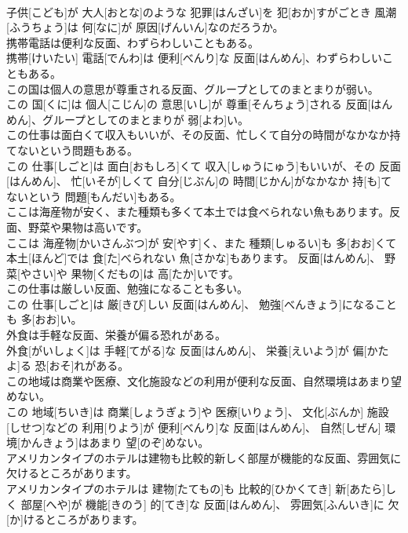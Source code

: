 \documentclass[8pt]{extreport}
\begin{document}
\begin{CJK}{UTF8}{min}
\\	子供[こども]が 大人[おとな]のような 犯罪[はんざい]を 犯[おか]すがごとき 風潮[ふうちょう]は 何[なに]が 原因[げんいん]なのだろうか。
\\	携帯電話は便利な反面、わずらわしいこともある。	
\\	携帯[けいたい] 電話[でんわ]は 便利[べんり]な 反面[はんめん]、わずらわしいこともある。
\\	この国は個人の意思が尊重される反面、グループとしてのまとまりが弱い。	
\\	この 国[くに]は 個人[こじん]の 意思[いし]が 尊重[そんちょう]される 反面[はんめん]、グループとしてのまとまりが 弱[よわ]い。
\\	この仕事は面白くて収入もいいが、その反面、忙しくて自分の時間がなかなか持てないという問題もある。	
\\	この 仕事[しごと]は 面白[おもしろ]くて 収入[しゅうにゅう]もいいが、その 反面[はんめん]、 忙[いそが]しくて 自分[じぶん]の 時間[じかん]がなかなか 持[も]てないという 問題[もんだい]もある。
\\	ここは海産物が安く、また種類も多くて本土では食べられない魚もあります。反面、野菜や果物は高いです。	
\\	ここは 海産物[かいさんぶつ]が 安[やす]く、また 種類[しゅるい]も 多[おお]くて 本土[ほんど]では 食[た]べられない 魚[さかな]もあります。 反面[はんめん]、 野菜[やさい]や 果物[くだもの]は 高[たか]いです。
\\	この仕事は厳しい反面、勉強になることも多い。	
\\	この 仕事[しごと]は 厳[きび]しい 反面[はんめん]、 勉強[べんきょう]になることも 多[おお]い。
\\	外食は手軽な反面、栄養が偏る恐れがある。	
\\	外食[がいしょく]は 手軽[てがる]な 反面[はんめん]、 栄養[えいよう]が 偏[かたよ]る 恐[おそ]れがある。
\\	この地域は商業や医療、文化施設などの利用が便利な反面、自然環境はあまり望めない。	
\\	この 地域[ちいき]は 商業[しょうぎょう]や 医療[いりょう]、 文化[ぶんか] 施設[しせつ]などの 利用[りよう]が 便利[べんり]な 反面[はんめん]、 自然[しぜん] 環境[かんきょう]はあまり 望[のぞ]めない。
\\	アメリカンタイプのホテルは建物も比較的新しく部屋が機能的な反面、雰囲気に欠けるところがあります。	
\\	アメリカンタイプのホテルは 建物[たてもの]も 比較的[ひかくてき] 新[あたら]しく 部屋[へや]が 機能[きのう] 的[てき]な 反面[はんめん]、 雰囲気[ふんいき]に 欠[か]けるところがあります。

\end{CJK}
\end{document}
